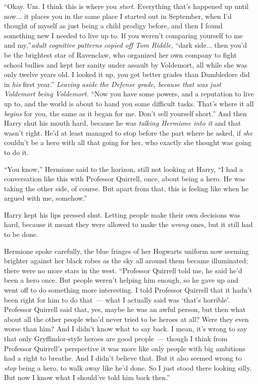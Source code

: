 ``Okay. Um. I think this is where you \emph{start.} Everything that's happened up until now... it places you in the same place I started out in September, when I'd thought of myself as just being a child prodigy before, and then I found something new I needed to live up to. If you weren't comparing yourself to me and my,''\emph{adult cognitive patterns copied off Tom Riddle,} ``dark side... then you'd be the brightest star of Ravenclaw, who organized her own company to fight school bullies and kept her sanity under assault by Voldemort, all while she was only twelve years old. I looked it up, you got better grades than Dumbledore did in \emph{his} first year.'' \emph{Leaving aside the Defense grade, because that was just Voldemort being Voldemort.} ``Now you have some powers, and a reputation to live up to, and the world is about to hand you some difficult tasks. That's where it all \emph{begins} for you, the same as it began for me. Don't sell yourself short.'' And then Harry shut his mouth hard, because he was \emph{talking Hermione into it} and that wasn't right. He'd at least managed to stop before the part where he asked, if \emph{she} couldn't be a hero with all that going for her, who exactly she thought was going to do it.

``You know,'' Hermione said to the horizon, still not looking at Harry, ``I had a conversation like this with Professor Quirrell, once, about being a hero. He was taking the other side, of course. But apart from that, this is feeling like when he argued with me, somehow.''

Harry kept his lips pressed shut. Letting people make their own decisions was hard, because it meant they were allowed to make the \emph{wrong} ones, but it still had to be done.

Hermione spoke carefully, the blue fringes of her Hogwarts uniform now seeming brighter against her black robes as the sky all around them became illuminated; there were no more stars in the west. ``Professor Quirrell told me, he said he'd been a hero once. But people weren't helping him enough, so he gave up and went off to do something more interesting. I told Professor Quirrell that it hadn't been right for him to do that~--- what I actually said was `that's horrible'. Professor Quirrell said that, yes, maybe he was an awful person, but then what about all the other people who'd never tried to be heroes at all? Were they even worse than him? And I didn't know what to say back. I mean, it's wrong to say that only Gryffindor-style heroes are good people~--- though I think from Professor Quirrell's perspective it was more like only people with big ambitions had a right to breathe. And I didn't believe that. But it also seemed wrong to \emph{stop} being a hero, to walk away like he'd done. So I just stood there looking silly. But now I know what I should've told him back then.''

